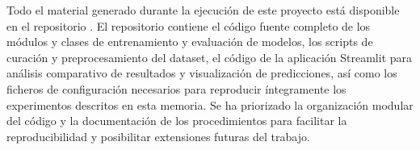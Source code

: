 Todo el material generado durante la ejecución de este proyecto está disponible en el repositorio \thegitrepo{}. El repositorio contiene el código fuente completo de los módulos y clases de entrenamiento y evaluación de modelos, los scripts de curación y preprocesamiento del dataset, el código de la aplicación Streamlit para análisis comparativo de resultados y visualización de predicciones, así como los ficheros de configuración necesarios para reproducir íntegramente los experimentos descritos en esta memoria. Se ha priorizado la organización modular del código y la documentación de los procedimientos para facilitar la reproducibilidad y posibilitar extensiones futuras del trabajo.
